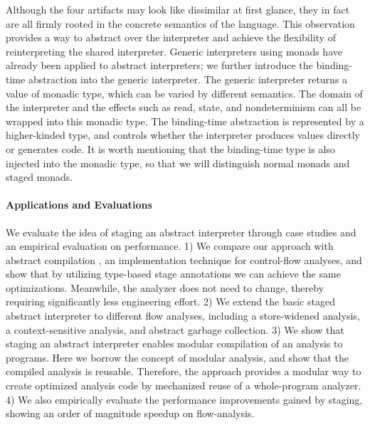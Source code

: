 Although the four artifacts may look like dissimilar at first
glance, they in fact are all firmly rooted in the concrete semantics of
the language.  This observation provides a way to abstract over the
interpreter and achieve the flexibility of reinterpreting the shared
interpreter. Generic interpreters using monads have already been
applied to abstract interpreters; we further introduce the
binding-time abstraction into the generic interpreter.  The generic
interpreter returns a value of monadic type, which can be varied by
different semantics. The domain of the interpreter and the effects
such as read, state, and nondeterminism can all be wrapped into this
monadic type.  The binding-time abstraction is represented by a
higher-kinded type, and controls whether the interpreter produces
values directly or generates code. It is worth mentioning that the
binding-time type is also injected into the monadic type, so that we
will distinguish normal monads and staged monads.

\paragraph{Applications and Evaluations}
We evaluate the idea of staging an abstract interpreter through
case studies and an empirical evaluation on performance.
1) We compare our approach with abstract compilation
\cite{Boucher:1996:ACN:647473.727587}, an implementation technique for
control-flow analyses, and show that by utilizing type-based stage
annotations we can achieve the same optimizations. Meanwhile,
the analyzer does not need to change, thereby requiring significantly less
engineering effort.
2) We extend the basic staged abstract interpreter to different flow
analyses, including a store-widened analysis, a context-sensitive
analysis, and abstract garbage collection.
3) We show that staging an abstract interpreter enables modular
compilation of an analysis to programs. Here we borrow the concept of
modular analysis, and show that the compiled analysis is reusable.
Therefore, the approach provides a modular way to create optimized
analysis code by mechanized reuse of a whole-program analyzer.
4) We also empirically evaluate the performance improvements gained by staging,
showing an order of magnitude speedup on flow-analysis.

